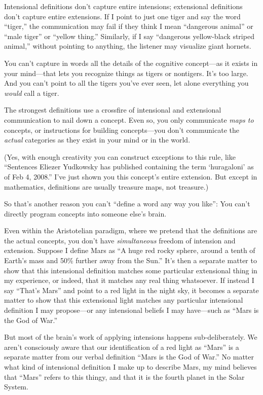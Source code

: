 {
 Intensional definitions don't capture entire
intensions; extensional definitions don't capture
entire extensions. If I point to just one tiger and say the word
``tiger,'' the communication may
fail if they think I mean ``dangerous
animal'' or ``male
tiger'' or ``yellow
thing.'' Similarly, if I say
``dangerous yellow-black striped
animal,'' without pointing to anything, the listener
may visualize giant hornets.}

{
 You can't capture in words all the details of the
cognitive concept---as it exists in your mind---that lets you recognize
things as tigers or nontigers. It's too large. And you
can't point to all the tigers you've
ever seen, let alone everything you \textit{would} call a tiger.}

{
 The strongest definitions use a crossfire of intensional and
extensional communication to nail down a concept. Even so, you only
communicate \textit{maps to} concepts, or instructions for building
concepts---you don't communicate the \textit{actual}
categories as they exist in your mind or in the world.}

{
 (Yes, with enough creativity you can construct exceptions to this
rule, like ``Sentences Eliezer Yudkowsky has published
containing the term `huragaloni' as of
Feb 4, 2008.'' I've just shown you
this concept's entire extension. But except in
mathematics, definitions are usually treasure maps, not treasure.)}

{
 So that's another reason you can't
``define a word any way you like'':
You can't directly program concepts into someone
else's brain.}

{
 Even within the Aristotelian paradigm, where we pretend that the
definitions are the actual concepts, you don't have
\textit{simultaneous} freedom of intension and extension. Suppose I
define Mars as ``A huge red rocky sphere, around a
tenth of Earth's mass and 50\% further away from the
Sun.'' It's then a separate matter to
show that this intensional definition matches some particular
extensional thing in my experience, or indeed, that it matches any real
thing whatsoever. If instead I say
``That's Mars'' and
point to a red light in the night sky, it becomes a separate matter to
show that this extensional light matches any particular intensional
definition I may propose---or any intensional beliefs I may have---such
as ``Mars is the God of War.''}

{
 But most of the brain's work of applying
intensions happens sub-deliberately. We aren't
consciously aware that our identification of a red light as
``Mars'' is a separate matter from
our verbal definition ``Mars is the God of
War.'' No matter what kind of intensional definition
I make up to describe Mars, my mind believes that
``Mars'' refers to this thingy, and
that it is the fourth planet in the Solar System.}

